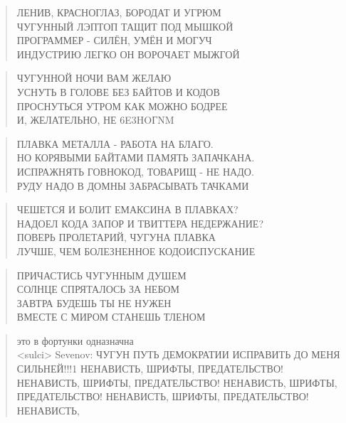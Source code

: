 \poemtitle{***}
\begin{verse}
ЛЕНИВ, КРАСНОГЛАЗ, БОРОДАТ И УГРЮМ\\
ЧУГУННЫЙ ЛЭПТОП ТАЩИТ ПОД МЫШКОЙ\\
ПРОГРАММЕР - СИЛЁН, УМЁН И МОГУЧ\\
ИНДУСТРИЮ ЛЕГКО ОН ВОРОЧАЕТ МЫЖГОЙ
\end{verse}

\poemtitle{***}
\begin{verse}
ЧУГУННОЙ НОЧИ ВАМ ЖЕЛАЮ\\
УСНУТЬ В ГОЛОВЕ БЕЗ БАЙТОВ И КОДОВ\\
ПРОСНУТЬСЯ УТРОМ КАК МОЖНО БОДРЕЕ \\
И, ЖЕЛАТЕЛЬНО, НЕ 6E3HOГNM
\end{verse}

\poemtitle{***}
\begin{verse}
ПЛАВКА МЕТАЛЛА - РАБОТА НА БЛАГО.\\
НО КОРЯВЫМИ БАЙТАМИ ПАМЯТЬ ЗАПАЧКАНА.\\
ИСПРАЖНЯТЬ ГОВНОКОД, ТОВАРИЩ - НЕ НАДО.\\
РУДУ НАДО В ДОМНЫ ЗАБРАСЫВАТЬ ТАЧКАМИ
\end{verse}

\poemtitle{***}
\begin{verse}
ЧЕШЕТСЯ И БОЛИТ ЕМАКСИНА В ПЛАВКАХ?\\
НАДОЕЛ КОДА ЗАПОР И ТВИТТЕРА НЕДЕРЖАНИЕ?\\
ПОВЕРЬ ПРОЛЕТАРИЙ, ЧУГУНА ПЛАВКА\\
ЛУЧШЕ, ЧЕМ БОЛЕЗНЕННОЕ КОДОИСПУСКАНИЕ
\end{verse}

\poemtitle{***}
\begin{verse}
ПРИЧАСТИСЬ ЧУГУННЫМ ДУШЕМ\\
СОЛНЦЕ СПРЯТАЛОСЬ ЗА НЕБОМ\\
ЗАВТРА БУДЕШЬ ТЫ НЕ НУЖЕН\\
ВМЕСТЕ С МИРОМ СТАНЕШЬ ТЛЕНОМ
\end{verse}

\poemtitle{***}
\begin{verse}
это в фортунки одназначна\\
[22:38:57]<sulci> Sevenov: ЧУГУН ПУТЬ ДЕМОКРАТИИ ИСПРАВИТЬ ДО МЕНЯ СИЛЬНЕЙ!!!1 НЕНАВИСТЬ, ШРИФТЫ, ПРЕДАТЕЛЬСТВО! НЕНАВИСТЬ, ШРИФТЫ, ПРЕДАТЕЛЬСТВО! НЕНАВИСТЬ, ШРИФТЫ, ПРЕДАТЕЛЬСТВО! НЕНАВИСТЬ, ШРИФТЫ, ПРЕДАТЕЛЬСТВО! НЕНАВИСТЬ,
\end{verse}

